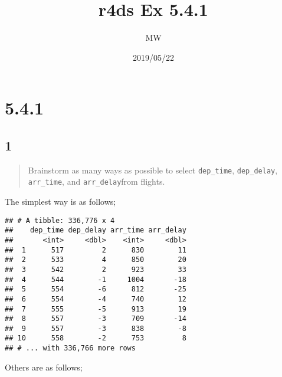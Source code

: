 \documentclass[]{article}
\title{r4ds Ex 5.4.1}
\author{MW}
\date{2019/05/22}
\newenvironment{Shaded}{\begin{snugshade}}{\end{snugshade}}
\newcommand{\KeywordTok}[1]{\textcolor[rgb]{0.13,0.29,0.53}{\textbf{#1}}}
\newcommand{\NormalTok}[1]{#1}
\newcommand{\OperatorTok}[1]{\textcolor[rgb]{0.81,0.36,0.00}{\textbf{#1}}}
\newcommand{\StringTok}[1]{\textcolor[rgb]{0.31,0.60,0.02}{#1}}
\begin{document}
\maketitle

\hypertarget{section}{%
\section{5.4.1}\label{section}}

\hypertarget{section-1}{%
\subsection{1}\label{section-1}}

\begin{quote}
Brainstorm as many ways as possible to select \texttt{dep\_time},
\texttt{dep\_delay}, \texttt{arr\_time}, and \texttt{arr\_delay}from
flights.
\end{quote}

The simplest way is as follows;

\begin{Shaded}
\end{Shaded}

\begin{verbatim}
## # A tibble: 336,776 x 4
##    dep_time dep_delay arr_time arr_delay
##       <int>     <dbl>    <int>     <dbl>
##  1      517         2      830        11
##  2      533         4      850        20
##  3      542         2      923        33
##  4      544        -1     1004       -18
##  5      554        -6      812       -25
##  6      554        -4      740        12
##  7      555        -5      913        19
##  8      557        -3      709       -14
##  9      557        -3      838        -8
## 10      558        -2      753         8
## # ... with 336,766 more rows
\end{verbatim}

Others are as follows;

\begin{Shaded}
\end{Shaded}
\end{document}
